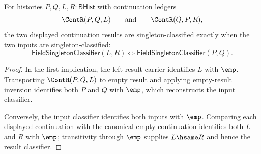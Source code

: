 \begin{theorem}
\label{thm:field-singleton-classifier-continuation-comm-iff}
For histories $P,Q,L,R:\mathsf{BHist}$ with continuation ledgers
$$
\ContR(P,Q,L)
\qquad\text{and}\qquad
\ContR(Q,P,R),
$$
the two displayed continuation results are singleton-classified exactly when
the two inputs are singleton-classified:
$$
\mathsf{FieldSingletonClassifier}(L,R)\Longleftrightarrow
\mathsf{FieldSingletonClassifier}(P,Q).
$$
\end{theorem}
\begin{proof}
In the first implication, the left result carrier identifies $L$ with $\emp$.
Transporting $\ContR(P,Q,L)$ to empty result and applying empty-result
inversion identifies both $P$ and $Q$ with $\emp$, which reconstructs the
input classifier.

Conversely, the input classifier identifies both inputs with $\emp$.
Comparing each displayed continuation with the canonical empty continuation
identifies both $L$ and $R$ with $\emp$; transitivity through $\emp$ supplies
$L\hsame R$ and hence the result classifier.
\end{proof}

